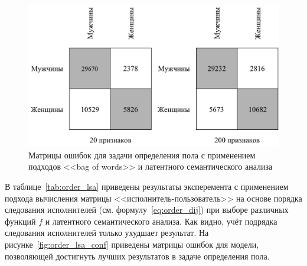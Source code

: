 \begin{figure}[!h]
\caption{Матрицы ошибок для задачи определения пола с
         применением подходов <<bag of words>> и
         латентного семантического анализа}
\label{fig:bow_lsa_conf}
\centering
\includegraphics[scale=0.75]{figs/bow-lsa-confusion.pdf}
\end{figure}

В таблице~\ref{tab:order_lsa} приведены результаты эксперемента
с применением подхода вычисления матрицы <<исполнитель-пользователь>>
на основе порядка следования исполнителей (см. формулу~\ref{eq:order_dij})
при выборе различных функций $f$ и латентного семантического анализа.
Как видно, учёт подрядка следования исполнителей только ухудшает результат.
На рисунке~\ref{fig:order_lsa_conf} приведены матрицы ошибок для 
модели, позволяющей достигнуть лучших результатов в задаче определения
пола.

